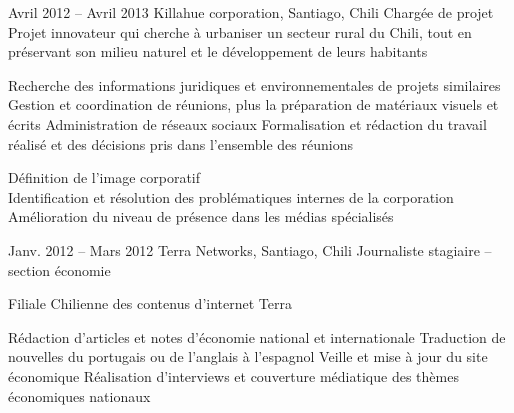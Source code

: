 \documentclass[30pt, french]{tccv}
\begin{document}
\begin{upshape}
\begin{textblock}{13}
\begin{mdframed}
\begin{eventlist}
\setlength{\parskip}{0pt}
\item{Avril 2012 -- Avril 2013 }     
  {Killahue corporation, Santiago, Chili}     
  {Chargée de projet}
\fontsize{9pt}{1em}\color{text}\bodyfontlight\upshape\selectfont
{} Projet innovateur qui cherche à urbaniser un secteur rural du Chili, tout en préservant son milieu naturel et le développement de leurs habitants \\
     
\setlength{\parskip}{-10pt}
\begin{itemize}
      \setlength\itemsep{-3pt} 
      \cvitem[\checkmark] Recherche des informations juridiques et environnementales de projets similaires          
      \cvitem[\checkmark] Gestion et coordination de réunions, plus la préparation de matériaux visuels et écrits   
      \cvitem[\checkmark] Administration de réseaux sociaux                                                                    
      \cvitem[\checkmark] Formalisation et rédaction du travail réalisé et des décisions pris dans l’ensemble des réunions     
\end{itemize}      

  Définition de l’image corporatif \\
\makebox[1.4cm][l]{}            Identification et résolution des problématiques internes de la corporation \\
\makebox[1.4cm][l]{} 		Amélioration du niveau de présence dans les médias spécialisés \\


  
\setlength{\parskip}{0pt}
\item{Janv. 2012 -- Mars 2012 }     
  {Terra Networks, Santiago, Chili}     
  {Journaliste stagiaire – section économie}
  \fontsize{9pt}{1em}\color{text}\bodyfontlight\upshape\selectfont

 Filiale Chilienne des contenus d’internet Terra  \\
  
\setlength{\parskip}{-10pt}
\begin{itemize}
      \setlength\itemsep{-3pt} 
      \cvitem[\checkmark] Rédaction d'articles et notes d’économie national et internationale
      \cvitem[\checkmark] Traduction de nouvelles du portugais ou de l'anglais à l'espagnol
      \cvitem[\checkmark] Veille et mise à jour du site économique
      \cvitem[\checkmark] Réalisation d'interviews et couverture médiatique des thèmes économiques nationaux
\end{itemize}        


\end{eventlist}
\end{mdframed}
\end{textblock}
\end{upshape}
\end{document}
